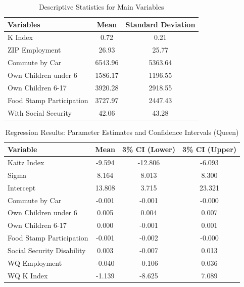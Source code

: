 \documentclass[12pt]{article}
\begin{document}
\begin{table}[H]
	\centering
	\begin{tabular}{lcc}
		\toprule
		\textbf{Variables}       & \textbf{Mean} & \textbf{Standard Deviation} \\
		\midrule
		K Index                  & 0.72          & 0.21                        \\
		ZIP Employment           & 26.93         & 25.77                       \\
		Commute by Car           & 6543.96       & 5363.64                     \\
		Own Children under 6     & 1586.17       & 1196.55                     \\
		Own Children 6-17        & 3920.28       & 2918.55                     \\
		Food Stamp Participation & 3727.97       & 2447.43                     \\
		With Social Security     & 42.06         & 43.28                       \\
		\bottomrule
	\end{tabular}
	\caption{Descriptive Statistics for Main Variables}
\end{table}

\begin{table}[H]
	\centering
	\begin{tabular}{lccc}
		\toprule
		\textbf{Variable}          & \textbf{Mean} & \textbf{3\% CI (Lower)} & \textbf{3\% CI (Upper)} \\
		\midrule
		Kaitz Index                & -9.594        & -12.806                 & -6.093                  \\
		Sigma                      & 8.164         & 8.013                   & 8.300                   \\
		Intercept                  & 13.808        & 3.715                   & 23.321                  \\
		Commute by Car             & -0.001        & -0.001                  & -0.000                  \\
		Own Children under 6       & 0.005         & 0.004                   & 0.007                   \\
		Own Children 6-17          & 0.000         & -0.001                  & 0.001                   \\
		Food Stamp Participation   & -0.001        & -0.002                  & -0.000                  \\
		Social Security Disability & 0.003         & -0.007                  & 0.013                   \\
		WQ Employment              & -0.040        & -0.106                  & 0.036                   \\
		WQ K Index                 & -1.139        & -8.625                  & 7.089                   \\
		\bottomrule
	\end{tabular}
	\caption{Regression Results: Parameter Estimates and Confidence Intervals (Queen)}
\end{table}
\end{document}
